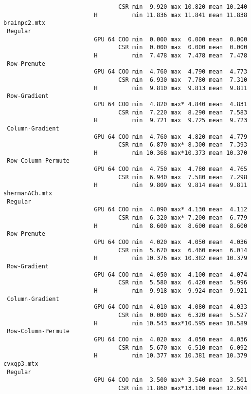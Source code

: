 {\begin{verbatim}
                                 CSR min  9.920 max 10.820 mean 10.240
                          H          min 11.836 max 11.841 mean 11.838
brainpc2.mtx
 Regular
                          GPU 64 COO min  0.000 max  0.000 mean  0.000
                                 CSR min  0.000 max  0.000 mean  0.000
                          H          min  7.478 max  7.478 mean  7.478
 Row-Premute
                          GPU 64 COO min  4.760 max  4.790 mean  4.773
                                 CSR min  6.930 max  7.780 mean  7.310
                          H          min  9.810 max  9.813 mean  9.811
 Row-Gradient
                          GPU 64 COO min  4.820 max* 4.840 mean  4.831
                                 CSR min  7.220 max  8.290 mean  7.583
                          H          min  9.721 max  9.725 mean  9.723
 Column-Gradient
                          GPU 64 COO min  4.760 max  4.820 mean  4.779
                                 CSR min  6.870 max* 8.300 mean  7.393
                          H          min 10.368 max*10.373 mean 10.370
 Row-Column-Permute
                          GPU 64 COO min  4.750 max  4.780 mean  4.765
                                 CSR min  6.940 max  7.580 mean  7.298
                          H          min  9.809 max  9.814 mean  9.811
shermanACb.mtx
 Regular
                          GPU 64 COO min  4.090 max* 4.130 mean  4.112
                                 CSR min  6.320 max* 7.200 mean  6.779
                          H          min  8.600 max  8.600 mean  8.600
 Row-Premute
                          GPU 64 COO min  4.020 max  4.050 mean  4.036
                                 CSR min  5.670 max  6.460 mean  6.014
                          H          min 10.376 max 10.382 mean 10.379
 Row-Gradient
                          GPU 64 COO min  4.050 max  4.100 mean  4.074
                                 CSR min  5.580 max  6.420 mean  5.996
                          H          min  9.918 max  9.924 mean  9.921
 Column-Gradient
                          GPU 64 COO min  4.010 max  4.080 mean  4.033
                                 CSR min  0.000 max  6.320 mean  5.527
                          H          min 10.543 max*10.595 mean 10.589
 Row-Column-Permute
                          GPU 64 COO min  4.020 max  4.050 mean  4.036
                                 CSR min  5.670 max  6.510 mean  6.092
                          H          min 10.377 max 10.381 mean 10.379
cvxqp3.mtx
 Regular
                          GPU 64 COO min  3.500 max* 3.540 mean  3.501
                                 CSR min 11.860 max*13.100 mean 12.694

\end{verbatim}}
